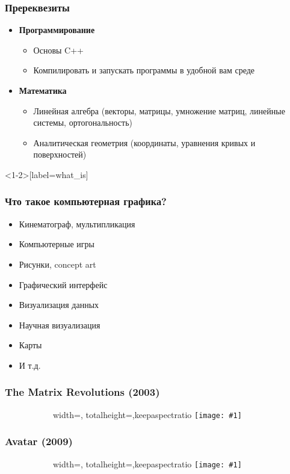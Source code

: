 \documentclass[10pt]{beamer}
\newcommand{\slideimage}[1]{
  \begin{figure}
    \begin{adjustbox}{width=\textwidth, totalheight=\textheight-2\baselineskip-2\baselineskip,keepaspectratio}
      \texttt{[image: \#1]}
    \end{adjustbox}
  \end{figure}
}
\begin{document}
\begin{frame}
\frametitle{Пререквезиты}
\pause
\begin{itemize}
\item \textbf{Программирование}
\pause
\begin{itemize}
\item Основы C++
\pause
\item Компилировать и запускать программы в удобной вам среде
\end{itemize}
\pause
\item \textbf{Математика}
\pause
\begin{itemize}
\item Линейная алгебра (векторы, матрицы, умножение матриц, линейные системы, ортогональность)
\pause
\item Аналитическая геометрия (координаты, уравнения кривых и поверхностей)
\end{itemize}
\end{itemize}
\end{frame}

\begin{frame}<1-2>[label=what_is]
\frametitle{Что такое компьютерная графика?}
\begin{itemize}
\pause %
\item Кинематограф, мультипликация
\pause %
\item Компьютерные игры
\pause %
\item Рисунки, concept art
\pause %
\item Графический интерфейс
\pause %
\item Визуализация данных
\pause %
\item Научная визуализация
\pause %
\item Карты
\pause %
\item И т.д.
\end{itemize}
\end{frame}

\begin{frame}
\frametitle{The Matrix Revolutions (2003)}
\begin{figure}
\slideimage{matrix.jpg}
\end{figure}
\end{frame}

\begin{frame}
\frametitle{Avatar (2009)}
\begin{figure}
\slideimage{avatar.jpg}
\end{figure}
\end{frame}
\end{document}
